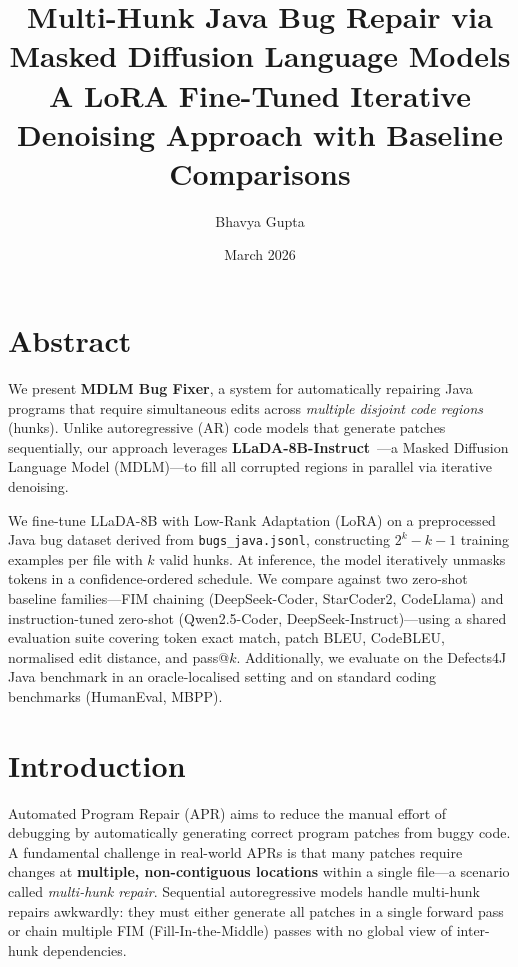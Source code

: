 \documentclass[11pt,a4paper]{article}
\title{%
  \textbf{Multi-Hunk Java Bug Repair via Masked Diffusion Language Models}\\[0.4em]
  \large A LoRA Fine-Tuned Iterative Denoising Approach with Baseline Comparisons
}
\author{Bhavya Gupta}
\date{March 2026}
\begin{document}
\maketitle
\tableofcontents
\newpage

\section{Abstract}

We present \textbf{MDLM Bug Fixer}, a system for automatically repairing Java programs that require simultaneous edits across \emph{multiple disjoint code regions} (hunks). Unlike autoregressive (AR) code models that generate patches sequentially, our approach leverages \textbf{LLaDA-8B-Instruct}~\cite{llada2024}—a Masked Diffusion Language Model (MDLM)—to fill all corrupted regions in parallel via iterative denoising.

We fine-tune LLaDA-8B with Low-Rank Adaptation (LoRA) on a preprocessed Java bug dataset derived from \texttt{bugs\_java.jsonl}, constructing \(2^k - k - 1\) training examples per file with \(k\) valid hunks. At inference, the model iteratively unmasks tokens in a confidence-ordered schedule. We compare against two zero-shot baseline families—FIM chaining (DeepSeek-Coder, StarCoder2, CodeLlama) and instruction-tuned zero-shot (Qwen2.5-Coder, DeepSeek-Instruct)—using a shared evaluation suite covering token exact match, patch BLEU, CodeBLEU, normalised edit distance, and pass@\(k\). Additionally, we evaluate on the Defects4J Java benchmark in an oracle-localised setting and on standard coding benchmarks (HumanEval, MBPP).

\section{Introduction}

Automated Program Repair (APR) aims to reduce the manual effort of debugging by automatically generating correct program patches from buggy code. A fundamental challenge in real-world APRs is that many patches require changes at \textbf{multiple, non-contiguous locations} within a single file—a scenario called \emph{multi-hunk repair}. Sequential autoregressive models handle multi-hunk repairs awkwardly: they must either generate all patches in a single forward pass or chain multiple FIM (Fill-In-the-Middle) passes with no global view of inter-hunk dependencies.
\end{document}
